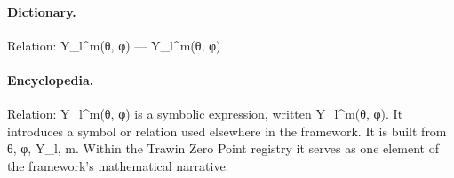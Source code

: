 \paragraph{Dictionary.}
Relation: Y\_l\textasciicircum{}m(θ, φ) — Y\_l\textasciicircum{}m(θ, φ)

\paragraph{Encyclopedia.}
Relation: Y\_l\textasciicircum{}m(θ, φ) is a symbolic expression, written Y\_l\textasciicircum{}m(θ, φ). It introduces a symbol or relation used elsewhere in the framework. It is built from θ, φ, Y\_l, m. Within the Trawin Zero Point registry it serves as one element of the framework's mathematical narrative.
